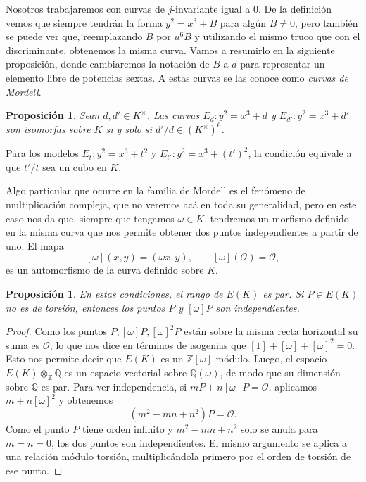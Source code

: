 \documentclass[a4paper]{book}
\theoremstyle{definition}
\theoremstyle{plain}
\newtheorem{prop}[definition]{Proposición}
\newcommand{\QQ}{\mathbb{Q}}
\newcommand{\ZZ}{\mathbb{Z}}
\newcommand{\OO}{\mathcal{O}}
\begin{document}
Nosotros trabajaremos con curvas de $j$-invariante igual a 0. De la definición vemos que siempre tendrán la forma $y^2 = x^3 + B$ para algún $B\neq 0$, pero también se puede ver que, reemplazando $B$ por $u^6B$ y utilizando el mismo truco que con el discriminante, obtenemos la misma curva. Vamos a resumirlo en la siguiente proposición, donde cambiaremos la notación de $B$ a $d$ para representar un elemento libre de potencias sextas. A estas curvas se las conoce como \emph{curvas de Mordell}.

\begin{prop}\label{prop:isomorfismosMordell}
Sean $d,d'\in K^\times$. Las curvas $E_d:y^2=x^3+d$ y $E_{d'}:y^2=x^3+d'$ son isomorfas sobre $K$ si y solo si $d'/d\in{(K^\times)}^6$.
\end{prop}

Para los modelos $E_t:y^2=x^3+t^2$ y $E_{t'}:y^2=x^3+{(t')}^2$, la condición equivale a que $t'/t$ sea un cubo en $K$.

Algo particular que ocurre en la familia de Mordell es el fenómeno de multiplicación compleja, que no veremos acá en toda su generalidad, pero en este caso nos da que, siempre que tengamos $\omega\in K$, tendremos un morfismo definido en la misma curva que nos permite obtener dos puntos independientes a partir de uno. El mapa
\[
[\omega](x,y)=(\omega x,y),\qquad [\omega](\OO)=\OO,
\]
es un automorfismo de la curva definido sobre $K$. 

\begin{prop}\label{prop:omegaIndependencia}
En estas condiciones, el rango de $E(K)$ es par. Si $P\in E(K)$ no es de torsión, entonces los puntos $P$ y $[\omega]P$ son independientes.
\end{prop}
\begin{proof}
Como los puntos $P,[\omega]P,{[\omega]}^2P$ están sobre la misma recta horizontal su suma es $\OO$, lo que nos dice en términos de isogenias que $[1]+[\omega]+{[\omega]}^2=0$. Esto nos permite decir que $E(K)$ es un $\ZZ[\omega]$-módulo. Luego, el espacio $E(K) \otimes_\ZZ \QQ$ es un espacio vectorial sobre $\QQ(\omega)$, de modo que su dimensión sobre $\QQ$ es par. Para ver independencia, si $mP+n[\omega]P=\OO$, aplicamos $m+n{[\omega]}^2$ y obtenemos
\[
(m^2-mn+n^2)P=\OO.
\]
Como el punto $P$ tiene orden infinito y $m^2-mn+n^2$ solo se anula para $m=n=0$, los dos puntos son independientes. El mismo argumento se aplica a una relación módulo torsión, multiplicándola primero por el orden de torsión de ese punto.
\end{proof}
\end{document}
